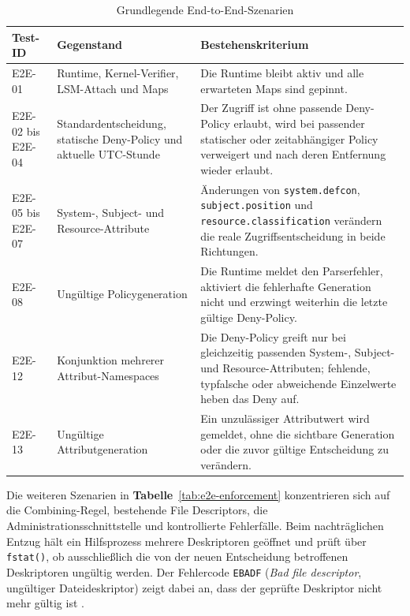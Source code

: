 \begin{table}[htbp]
    \centering


    \begin{tabular}{>{\raggedright\arraybackslash}p{}>{\raggedright\arraybackslash}p{}p{}}
        \hline
        \textbf{Test-ID} & \textbf{Gegenstand} & \textbf{Bestehenskriterium} \\
        \hline
        E2E-01 & Runtime, Kernel-Verifier, LSM-Attach und Maps & Die Runtime bleibt aktiv und alle
        erwarteten Maps sind gepinnt. \\
        E2E-02 bis E2E-04 & Standardentscheidung, statische Deny-Policy und aktuelle UTC-Stunde &
        Der Zugriff ist ohne passende Deny-Policy erlaubt, wird bei passender statischer oder
        zeitabhängiger Policy verweigert und nach deren Entfernung wieder erlaubt. \\
        E2E-05 bis E2E-07 & System-, Subject- und Resource-Attribute & Änderungen von
        \texttt{system.defcon}, \texttt{subject.position} und
        \texttt{resource.classification} verändern die reale Zugriffsentscheidung in beide
        Richtungen. \\
        E2E-08 & Ungültige Policygeneration & Die Runtime meldet den Parserfehler, aktiviert die
        fehlerhafte Generation nicht und erzwingt weiterhin die letzte gültige Deny-Policy. \\
        E2E-12 & Konjunktion mehrerer Attribut-Namespaces & Die Deny-Policy greift nur bei
        gleichzeitig passenden System-, Subject- und Resource-Attributen; fehlende, typfalsche
        oder abweichende Einzelwerte heben das Deny auf. \\
        E2E-13 & Ungültige Attributgeneration & Ein unzulässiger Attributwert wird gemeldet, ohne
        die sichtbare Generation oder die zuvor gültige Entscheidung zu verändern. \\
        \hline
    \end{tabular}
    \caption{Grundlegende End-to-End-Szenarien}
    \label{tab:e2e-basis}
\end{table}
Die weiteren Szenarien in \textbf{Tabelle}~\ref{tab:e2e-enforcement} konzentrieren sich auf die
Combining-Regel, bestehende File Descriptors, die Administrationsschnittstelle und kontrollierte
Fehlerfälle. Beim nachträglichen Entzug hält ein Hilfsprozess mehrere Deskriptoren geöffnet und
prüft über \texttt{fstat()}, ob ausschließlich die von der neuen Entscheidung betroffenen
Deskriptoren ungültig werden. Der Fehlercode \texttt{EBADF} (\emph{Bad file descriptor},
ungültiger Dateideskriptor) zeigt dabei an, dass der geprüfte Deskriptor nicht mehr gültig ist
\citep{manErrno}.

